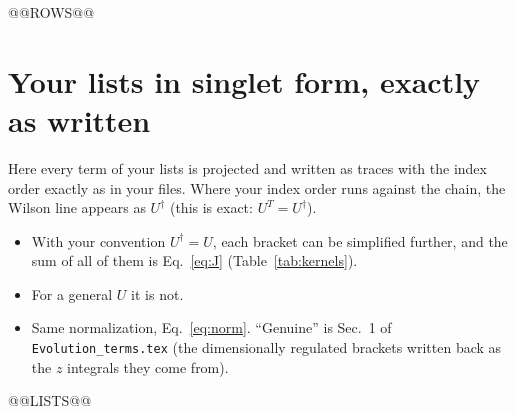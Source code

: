 \documentclass[10pt]{article}
\numberwithin{equation}{section}
\begin{document}
@@ROWS@@

\appendix
\section{Your lists in singlet form, exactly as written}\label{app:lists}
Here every term of your lists is projected and written as traces with the index order exactly as in your files. Where your index order runs against the chain, the Wilson line appears as $U^\dagger$ (this is exact: $U^T=U^\dagger$).
\begin{itemize}
\item With your convention $U^\dagger=U$, each bracket can be simplified further, and the sum of all of them is Eq.~\eqref{eq:J} (Table~\ref{tab:kernels}).
\item For a general $U$ it is not.
\item Same normalization, Eq.~\eqref{eq:norm}. ``Genuine'' is Sec.~1 of \texttt{Evolution\_terms.tex} (the dimensionally regulated brackets written back as the $z$ integrals they come from).
\end{itemize}

@@LISTS@@

\end{document}
